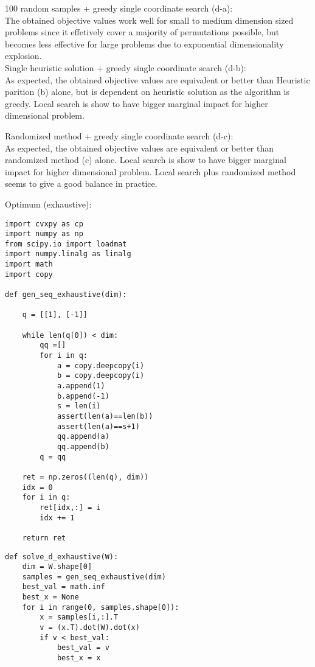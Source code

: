 \documentclass[12pt,letter]{article}
\begin{document}
\begin{enumerate}
\begin{enumerate}
    100 random samples + greedy single coordinate search (d-a):\\
    The obtained objective values work well for small to medium dimension sized problems since it effetively cover a majority of permutations possible, but becomes less effective for large problems due to exponential dimensionality explosion.\\
    
    Single heuristic solution + greedy single coordinate search (d-b):\\
    As expected, the obtained objective values are equivalent or better than Heuristic parition (b) alone, but is dependent on heuristic solution as the algorithm is greedy. Local search is show to have bigger marginal impact for higher dimensional problem.

    Randomized method + greedy single coordinate search (d-c):\\
    As expected, the obtained objective values are equivalent or better than randomized method (c) alone. Local search is show to have bigger marginal impact for higher dimensional problem. Local search plus randomized method seems to give a good balance in practice.
    
    \pagebreak

    Optimum (exhaustive):
\begin{verbatim}
import cvxpy as cp
import numpy as np
from scipy.io import loadmat
import numpy.linalg as linalg
import math
import copy

def gen_seq_exhaustive(dim):
    
    q = [[1], [-1]]

    while len(q[0]) < dim:
        qq =[]
        for i in q:
            a = copy.deepcopy(i)
            b = copy.deepcopy(i)
            a.append(1)
            b.append(-1)
            s = len(i)
            assert(len(a)==len(b))
            assert(len(a)==s+1)
            qq.append(a)
            qq.append(b)
        q = qq

    ret = np.zeros((len(q), dim))
    idx = 0
    for i in q:
        ret[idx,:] = i
        idx += 1

    return ret
\end{verbatim}
    \pagebreak
\begin{verbatim}
def solve_d_exhaustive(W):
    dim = W.shape[0]
    samples = gen_seq_exhaustive(dim)
    best_val = math.inf
    best_x = None
    for i in range(0, samples.shape[0]):
        x = samples[i,:].T
        v = (x.T).dot(W).dot(x)
        if v < best_val:
            best_val = v
            best_x = x
            

\end{verbatim}
\end{enumerate}
\end{enumerate}
\end{document}
